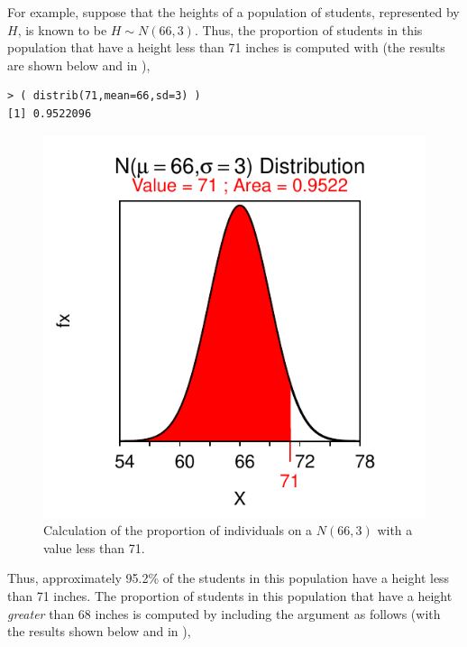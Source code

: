 \documentclass[10pt,openany]{book}\usepackage[]{graphicx}\usepackage[]{color}
\makeatletter
\newenvironment{kframe}{%
 \def\at@end@of@kframe{}%
 \ifinner\ifhmode%
  \def\at@end@of@kframe{\end{minipage}}%
  \begin{minipage}{\columnwidth}%
 \fi\fi%
 \def\FrameCommand##1{\hskip\@totalleftmargin \hskip-\fboxsep
 \colorbox{shadecolor}{##1}\hskip-\fboxsep
     \hskip-\linewidth \hskip-\@totalleftmargin \hskip\columnwidth}%
 \MakeFramed {\advance\hsize-\width
   \@totalleftmargin\z@ \linewidth\hsize
   \@setminipage}}%
 {\par\unskip\endMakeFramed%
 \at@end@of@kframe}
\newenvironment{knitrout}{}{} %
\makeatother
\begin{document}
For example, suppose that the heights of a population of students, represented by $H$, is known to be $H\sim N(66,3)$.  Thus, the proportion of students in this population that have a height less than 71 inches is computed with (the results are shown below and in ),
\begin{knitrout}
\color{fgcolor}\begin{kframe}
\begin{verbatim}
> ( distrib(71,mean=66,sd=3) )
[1] 0.9522096
\end{verbatim}
\end{kframe}\begin{figure}[hbtp]

{\centering \includegraphics[width=.4\linewidth]{Figs/NormZCalc1-1} 

}

\caption[Calculation of the proportion of individuals on a $N(66,3)$ with a value less than 71]{Calculation of the proportion of individuals on a $N(66,3)$ with a value less than 71.}\label{fig:NormZCalc1}
\end{figure}


\end{knitrout}
Thus, approximately 95.2\% of the students in this population have a height less than 71 inches.  The proportion of students in this population that have a height \textit{greater} than 68 inches is computed by including the  argument as follows (with the results shown below and in ),
\end{document}
